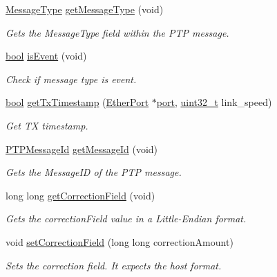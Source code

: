 \begin{DoxyCompactItemize}
\hyperlink{avbts__message_8hpp_ac6606ebe91c8ac66a2c314c79f5ab013}{Message\+Type} \hyperlink{class_p_t_p_message_common_aa9e0a02eadc0da0ddbade7fdb09d9309}{get\+Message\+Type} (void)
\begin{DoxyCompactList}\small\item\em Gets the Message\+Type field within the P\+TP message. \end{DoxyCompactList}\item 
\hyperlink{avb__gptp_8h_af6a258d8f3ee5206d682d799316314b1}{bool} \hyperlink{class_p_t_p_message_common_a2dd36fdb6a9dbfcfdab03f6162581373}{is\+Event} (void)
\begin{DoxyCompactList}\small\item\em Check if message type is event. \end{DoxyCompactList}\item 
\hyperlink{avb__gptp_8h_af6a258d8f3ee5206d682d799316314b1}{bool} \hyperlink{class_p_t_p_message_common_a715dccee35cbc56372f8b003600b8ef9}{get\+Tx\+Timestamp} (\hyperlink{class_ether_port}{Ether\+Port} $\ast$\hyperlink{gst__avb__playbin_8c_a63c89c04d1feae07ca35558055155ffb}{port}, \hyperlink{parse_8c_a6eb1e68cc391dd753bc8ce896dbb8315}{uint32\+\_\+t} link\+\_\+speed)
\begin{DoxyCompactList}\small\item\em Get TX timestamp. \end{DoxyCompactList}\item 
\hyperlink{class_p_t_p_message_id}{P\+T\+P\+Message\+Id} \hyperlink{class_p_t_p_message_common_a5cd92d7e4383eedc84db3781940ba4e0}{get\+Message\+Id} (void)
\begin{DoxyCompactList}\small\item\em Gets the Message\+ID of the P\+TP message. \end{DoxyCompactList}\item 
long long \hyperlink{class_p_t_p_message_common_a9930feb44509700c6a81aa4e747357ca}{get\+Correction\+Field} (void)
\begin{DoxyCompactList}\small\item\em Gets the correction\+Field value in a Little-\/\+Endian format. \end{DoxyCompactList}\item 
void \hyperlink{class_p_t_p_message_common_acecb3e9987905070c3e9d089bae8e70d}{set\+Correction\+Field} (long long correction\+Amount)
\begin{DoxyCompactList}\small\item\em Sets the correction field. It expects the host format. \end{DoxyCompactList}\item 

\end{DoxyCompactItemize}

